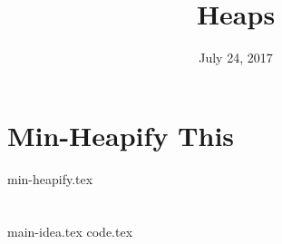 \documentclass{exam}
\title{Heaps}
\date{July 24, 2017}
\begin{document}
\maketitle

\section{Min-Heapify This}
\begin{questions}
{min-heapify.tex}
\end{questions}

\clearpage

\section{}
\begin{questions}
{main-idea.tex}
{code.tex}
\end{questions}
\end{document}
